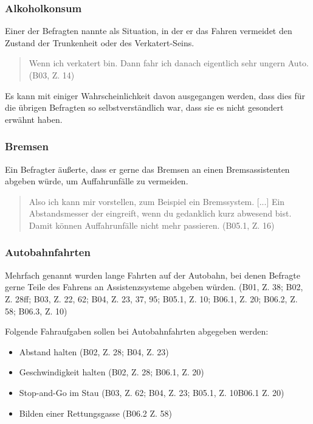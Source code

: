 \documentclass[12pt]{article}
\begin{document}
\subsubsection*{Alkoholkonsum}
Einer der Befragten nannte als Situation, in der er das Fahren vermeidet den Zustand der Trunkenheit oder des Verkatert-Seins.

\begin{quote}
  Wenn ich verkatert bin. Dann fahr ich danach eigentlich sehr ungern Auto. (B03, Z. 14)
\end{quote}

Es kann mit einiger Wahrscheinlichkeit davon ausgegangen werden, dass dies für die übrigen Befragten so selbstverständlich war, dass sie es nicht gesondert erwähnt haben.

\subsubsection*{Bremsen}
Ein Befragter äußerte, dass er gerne das Bremsen an einen Bremsassistenten abgeben würde, um Auffahrunfälle zu vermeiden.

\begin{quote}
  Also ich kann mir vorstellen, zum Beispiel ein Bremssystem. [...] Ein Abstandsmesser der eingreift, wenn du gedanklich kurz abwesend bist. Damit können Auffahrunfälle nicht mehr passieren. (B05.1, Z. 16)
\end{quote}

\subsubsection*{Autobahnfahrten}
Mehrfach genannt wurden lange Fahrten auf der Autobahn, bei denen Befragte gerne Teile des Fahrens an Assistenzsysteme abgeben würden. (B01, Z. 38; B02, Z. 28ff; B03, Z. 22, 62; B04, Z. 23, 37, 95; B05.1, Z. 10; B06.1, Z. 20; B06.2, Z. 58; B06.3, Z. 10)

Folgende Fahraufgaben sollen bei Autobahnfahrten abgegeben werden:
\begin{itemize}
  \item Abstand halten (B02, Z. 28; B04, Z. 23)
  \item Geschwindigkeit halten (B02, Z. 28; B06.1, Z. 20)
  \item Stop-and-Go im Stau (B03, Z. 62; B04, Z. 23; B05.1, Z. 10B06.1 Z. 20)
  \item Bilden einer Rettungsgasse (B06.2 Z. 58)
\end{itemize}
\end{document}
